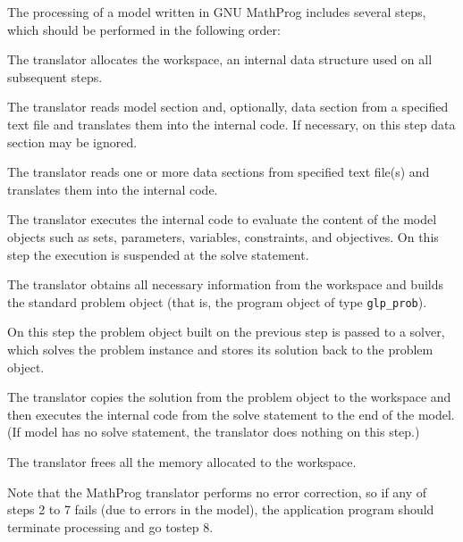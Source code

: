 The processing of a model written in GNU MathProg includes several
steps, which should be performed in the following order:


The translator allocates the workspace, an internal data structure used
on all subsequent steps.

 The translator reads model
section and, optionally, data section from a specified text file and
translates them into the internal code. If necessary, on this step data
section may be ignored.

 The translator reads one or
more data sections from specified text file(s) and translates them into
the internal code.

 The translator executes the
internal code to evaluate the content of the model objects such as sets,
parameters, variables, constraints, and objectives. On this step the
execution is suspended at the solve statement.

 The translator obtains all
necessary information from the workspace and builds the standard
problem object (that is, the program object of type \verb|glp_prob|).

 On this step the problem object
built on the previous step is passed to a solver, which solves the
problem instance and stores its solution back to the problem object.

 The translator copies the
solution from the problem object to the workspace and then executes the
internal code from the solve statement to the end of the model.
(If model has no solve statement, the translator does nothing on this
step.)

 The translator frees all the
memory allocated to the workspace.


Note that the MathProg translator performs no error correction, so if
any of steps 2 to 7 fails (due to errors in the model), the application
program should terminate processing and go to\linebreak step 8.

